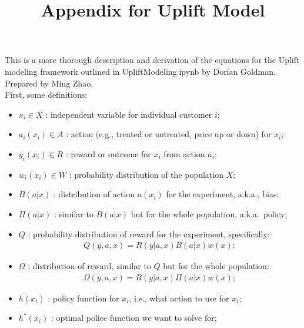 \documentclass[11pt, oneside]{article}   	%
\title{Appendix for Uplift Model}
\author{}
\begin{document}
\maketitle

This is a more thorough description and derivation of the equations for the Uplift modeling framework outlined in UpliftModeling.ipynb by Dorian Goldman. Prepared by Ming Zhao.\\


First, some definitions:
\begin{itemize}
\item $x_i \in X$ : independent variable for individual customer $i$;
\item $a_i(x_i) \in A$ : action (e.g., treated or untreated, price up or down) for $x_i$;
\item $y_i(x_i) \in R$ : reward or outcome for $x_i$ from action $a_i$;
\item $w_i(x_i) \in W$ : probability distribution of the population $X$;
\item $B(a|x)$ : distribution  of action $a(x_i)$ for the experiment, a.k.a., bias;
\item $\Pi(a|x)$ : similar to $B(a|x)$ but for the whole population, a.k.a.\ policy;
\item $Q$ :  probability distribution of reward for the experiment, specifically:
\begin{align} %
   Q(y, a, x) = R(y | a, x) B(a | x) w(x) ;
\label{q}
\end{align}

\item $\Omega$ :  distribution of reward, similar to $Q$ but for the whole population:
\begin{align} %
   \Omega(y, a, x) = R(y | a, x) \Pi(a | x) w(x) ;
\label{omega}
\end{align}

\item $h(x_i)$ : policy function for $x_i$, i.e., what action to use for $x_i$;
\item $h^*(x_i)$ : optimal police function we want to solve for;
\end{itemize}
\end{document}
